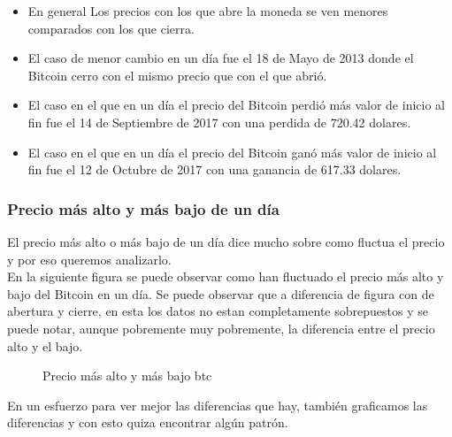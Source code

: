 \documentclass[12pt,letterpaper]{article}
\begin{document}
    \begin{itemize}

        \item En general Los precios con los que abre la moneda se ven menores comparados con los que cierra.

        \item El caso de menor cambio en un d\'ia fue el 18 de Mayo de 2013 donde el Bitcoin cerro con el mismo precio que con el que abri\'o.

        \item El caso en el que en un d\'ia el precio del Bitcoin perdi\'o m\'as valor de inicio al fin fue el 14 de Septiembre de 2017 con una perdida de 720.42 dolares.

        \item El caso en el que en un d\'ia el precio del Bitcoin gan\'o m\'as valor de inicio al fin fue el 12 de Octubre de 2017 con una ganancia de 617.33 dolares.

    \end{itemize}


    \subsubsection*{Precio más alto y más bajo de un día}

    El precio m\'as alto o m\'as bajo de un d\'ia dice mucho sobre como fluctua el precio y por eso queremos analizarlo.
    \\

    En la siguiente figura se puede observar como han fluctuado el precio m\'as alto y bajo del Bitcoin en un d\'ia. Se puede observar que a diferencia de figura con de abertura y cierre, en esta los datos no estan completamente sobrepuestos y se puede notar, aunque pobremente muy pobremente, la diferencia entre el precio alto y el bajo.
    \\

    \begin{figure}
        \centering


        \caption{Precio m\'as alto y m\'as bajo btc}
    \end{figure}

    En un esfuerzo para ver mejor las diferencias que hay, tambi\'en graficamos las diferencias y con esto quiza encontrar alg\'un patr\'on.
\end{document}
